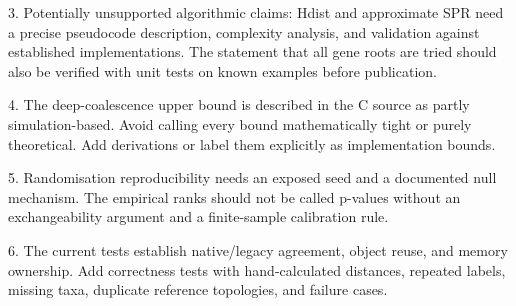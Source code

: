 3. Potentially unsupported algorithmic claims: Hdist and approximate SPR need a precise pseudocode description,
   complexity analysis, and validation against established implementations. The statement that all gene roots are tried
   should also be verified with unit tests on known examples before publication.

4. The deep-coalescence upper bound is described in the C source as partly simulation-based. Avoid calling every bound
   mathematically tight or purely theoretical. Add derivations or label them explicitly as implementation bounds.

5. Randomisation reproducibility needs an exposed seed and a documented null mechanism. The empirical ranks should not
   be called p-values without an exchangeability argument and a finite-sample calibration rule.

6. The current tests establish native/legacy agreement, object reuse, and memory ownership. Add correctness tests with
   hand-calculated distances, repeated labels, missing taxa, duplicate reference topologies, and failure cases.
\fi
